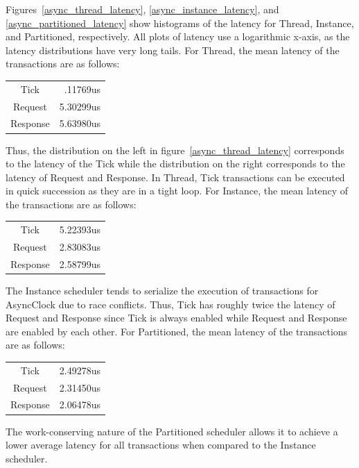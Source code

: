 Figures~\ref{async_thread_latency}, \ref{async_instance_latency}, and \ref{async_partitioned_latency} show histograms of the latency for Thread, Instance, and Partitioned, respectively.
All plots of latency use a logarithmic x-axis, as the latency distributions have very long tails.
For Thread, the mean latency of the transactions are as follows:
\begin{center}
\begin{tabular}{cr}
Tick     &  .11769us \\
Request  & 5.30299us \\
Response & 5.63980us \\
\end{tabular}
\end{center}
Thus, the distribution on the left in figure~\ref{async_thread_latency} corresponds to the latency of the Tick while the distribution on the right corresponds to the latency of Request and Response.
In Thread, Tick transactions can be executed in quick succession as they are in a tight loop.
For Instance, the mean latency of the transactions are as follows:
\begin{center}
\begin{tabular}{cr}
Tick     & 5.22393us \\
Request  & 2.83083us \\
Response & 2.58799us \\
\end{tabular}
\end{center}
The Instance scheduler tends to serialize the execution of transactions for AsyncClock due to race conflicts.
Thus, Tick has roughly twice the latency of Request and Response since Tick is always enabled while Request and Response are enabled by each other.
For Partitioned, the mean latency of the transactions are as follows:
\begin{center}
\begin{tabular}{cr}
Tick     & 2.49278us \\
Request  & 2.31450us \\
Response & 2.06478us \\
\end{tabular}
\end{center}
The work-conserving nature of the Partitioned scheduler allows it to achieve a lower average latency for all transactions when compared to the Instance scheduler.

